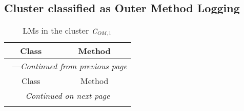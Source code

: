 \subsection{Cluster classified as Outer Method Logging}

\begin{center}
\begin{longtable}{ll}
\caption{LMs in the cluster $\mathit{C}_{\mathit{OM},1}$}\\
\toprule\multicolumn{1}{c}{Class}&\multicolumn{1}{c}{Method}\\\midrule
\endfirsthead

\multicolumn{2}{c}{\tablename\ \thetable{}---\textit{Continued from previous page}} \\\midrule
\multicolumn{1}{c}{Class}&\multicolumn{1}{c}{Method}\\\midrule
\endhead
\multicolumn{2}{c}{\textit{Continued on next page}}\\\midrule
\endfoot
\bottomrule
\endlastfoot


\end{longtable}
\end{center}
